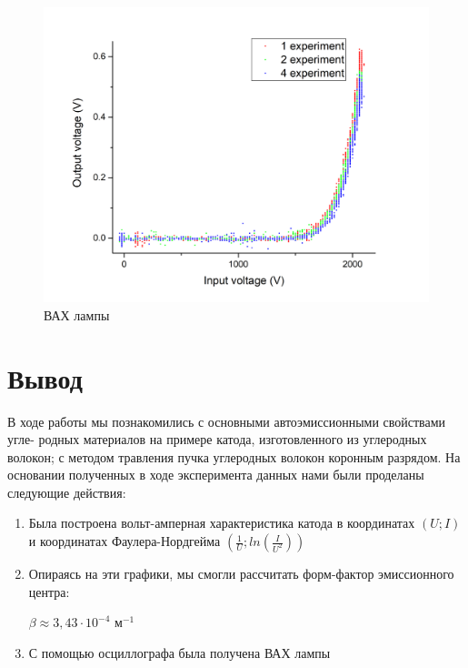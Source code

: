\documentclass[a4paper,12pt]{article}
\theoremstyle{plain} %
\theoremstyle{definition} %
\theoremstyle{remark} %
\begin{document}
\begin{figure}[H]
	\centering
	\includegraphics[scale=0.55]{Graph3.jpg}
	\caption{ВАХ лампы}
	\label{BAX}
\end{figure}

\section{Вывод}	
	
В ходе работы мы познакомились с основными автоэмиссионными свойствами угле- родных материалов на примере катода, изготовленного из углеродных волокон; с методом травления пучка углеродных волокон коронным разрядом.
На основании полученных в ходе эксперимента данных нами были проделаны следующие действия:
\begin{enumerate}
    \item Была построена вольт-амперная характеристика катода в координатах $(U;I)$ и координатах Фаулера-Нордгейма $(\frac{1}{U};ln(\frac{I}{U^2}))$
    \item Опираясь на эти графики, мы смогли рассчитать форм-фактор эмиссионного центра:
    \begin{center}
        $\beta\approx 3,43\cdot 10^{-4} \text{ м}^{-1}$
    \end{center}
    \item С помощью осциллографа была получена ВАХ лампы
\end{enumerate}
\end{document}

